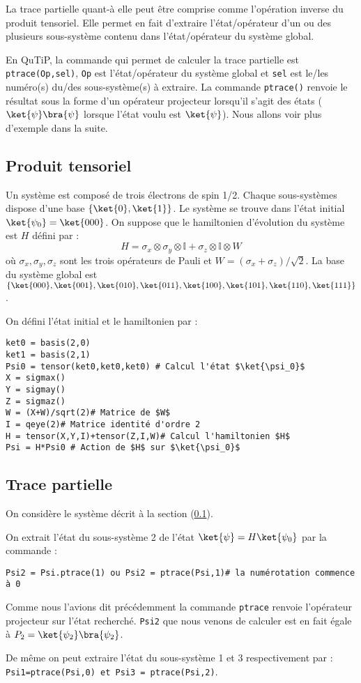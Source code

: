 La trace partielle quant-à elle peut être comprise comme l'opération inverse du 
produit tensoriel. Elle permet en fait d'extraire l'état/opérateur d'un ou des 
plusieurs sous-système contenu dans l'état/opérateur du système global.

En QuTiP, la commande qui permet de calculer la trace partielle est 
\texttt{ptrace(Op,sel)}, \texttt{Op} est l'état/opérateur du système global et 
\texttt{sel} est le/les numéro(s) du/des sous-système(s) à extraire. La 
commande \texttt{ptrace()} renvoie le résultat sous la forme d'un opérateur 
projecteur lorsqu'il s'agit des états ($\ket{\psi}\bra{\psi}$ lorsque l'état 
voulu est $\ket{\psi}$). Nous allons voir plus d'exemple dans la suite.
\subsection{Produit tensoriel} \label{tensor}
Un système est composé de trois électrons de spin 1/2. Chaque sous-systèmes 
dispose d'une base $\{\ket{0},\ket{1}\}$. Le système se trouve dans l'état 
initial $\ket{\psi_0}=\ket{000}$. On suppose que le hamiltonien d'évolution du 
système est $H$ défini par :
\begin{equation}
H = \sigma_x\otimes\sigma_y\otimes\mathbb{I}+\sigma_z\otimes\mathbb{I}\otimes W
\end{equation}
où $\sigma_x,\sigma_y,\sigma_z$ sont les trois opérateurs de Pauli et 
$W=(\sigma_x+\sigma_z)/\sqrt{2}$. La base du système global est 
$\{\ket{000},\ket{001},\ket{010},\ket{011},\ket{100},\ket{101},\ket{110},\ket{
111}\}$.

On défini l'état initial et le hamiltonien par :\\
\begin{lstlisting}
ket0 = basis(2,0)
ket1 = basis(2,1)
Psi0 = tensor(ket0,ket0,ket0) # Calcul l'état $\ket{\psi_0}$
X = sigmax()
Y = sigmay()
Z = sigmaz()
W = (X+W)/sqrt(2)# Matrice de $W$
I = qeye(2)# Matrice identité d'ordre 2
H = tensor(X,Y,I)+tensor(Z,I,W)# Calcul l'hamiltonien $H$
Psi = H*Psi0 # Action de $H$ sur $\ket{\psi_0}$
\end{lstlisting}

\subsection{Trace partielle}

On considère le système décrit à la section (\ref{tensor}).

On extrait l'état du sous-système 2 de l'état $\ket{\psi}=H\ket{\psi_0}$ par la 
commande :\\
\begin{lstlisting}
Psi2 = Psi.ptrace(1) ou Psi2 = ptrace(Psi,1)# la numérotation commence à 0
\end{lstlisting}
Comme nous l'avions dit précédemment la commande \texttt{ptrace} renvoie 
l'opérateur projecteur sur l'état recherché. \texttt{Psi2} que nous venons de 
calculer est en fait égale à $P_2=\ket{\psi_2}\bra{\psi_2}$.

De même on peut extraire l'état du sous-système 1 et 3 respectivement par :\\ 
\texttt{Psi1=ptrace(Psi,0) et Psi3 = ptrace(Psi,2)}.

